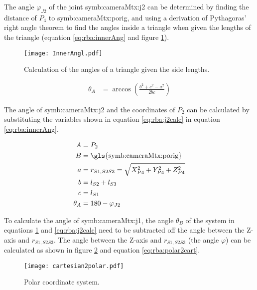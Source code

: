 \documentclass{article}
\newcommand{\sie}[1]{\text{\gls{symb:cameraMtx:#1}}}   %
\newcommand{\sba}[1]{\gls{symb:cameraMtx:#1}}          %
\begin{document}
The angle $\varphi_{J2}$ of the joint \sba{j2} can be determined by finding the distance of $P_4$ to \sba{porig}, and using a derivation of Pythagoras' right angle theorem to find the angles inside a triangle when given the lengths of the triangle (equation \ref{eq:rba:innerAng} and figure \ref{fig:rba:triinner}).

\begin{figure}[h]
\centering
    \texttt{[image: InnerAngl.pdf]} 
    \caption{Calculation of the angles of a triangle given the side lengths.}
    \label{fig:rba:triinner}
\end{figure}

\begin{align}
    \theta_A &= \arccos(\frac{b^2+c^2 - a^2}{2bc}) \label{eq:rba:innerAng}
\end{align}

The angle of \sba{j2} and the coordinates of $P_2$ can be calculated by substituting the variables shown in equation \ref{eq:rba:j2calc} in equation \ref{eq:rba:innerAng}.

\begin{align}
    \begin{split}
        A &= P_2\\
        B &= \sie{porig}\\
        a &= r_{S1,S2S3} = \sqrt{X_{P4}^2 + Y_{P4}^2 + Z_{P4}^2}\\
        b &= l_{S2} + l_{S3}\\
        c &= l_{S1}\\
    \theta_A &= 180 - \varphi_{J2}
    \end{split} \label{eq:rba:j2calc}
\end{align}

To calculate the angle of \sba{j1}, the angle $\theta_B$ of the system in equations \ref{fig:rba:triinner} and \ref{eq:rba:j2calc} need to be subtracted off the angle between the Z-axis and $r_{S1,S2S3}$.  The angle between the Z-axis and $r_{S1,S2S3}$ (the angle $\varphi$) can be calculated as shown in figure \ref{fig:rba:polar} and equation \ref{eq:rba:polar2cart}.


\begin{figure}[h]
\centering
    \texttt{[image: cartesian2polar.pdf]} 
    \caption{Polar coordinate system.}
    \label{fig:rba:polar}
\end{figure}
\end{document}
